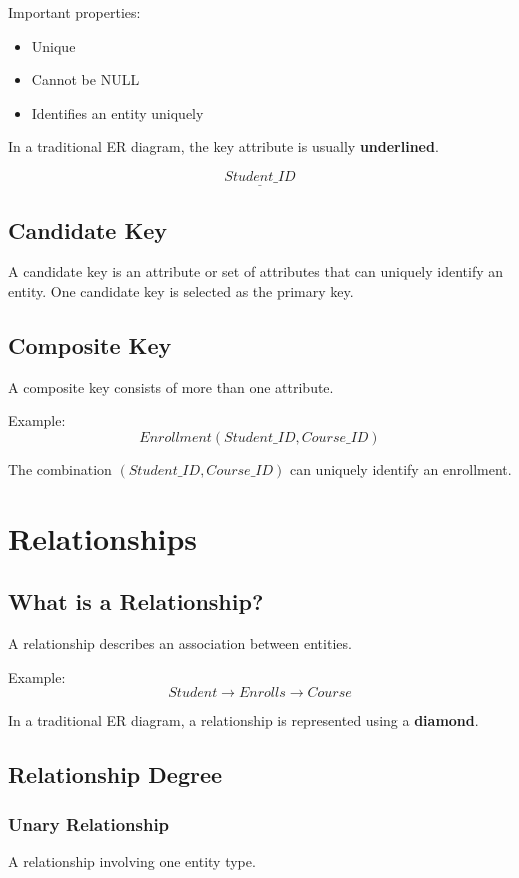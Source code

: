\documentclass[12pt,a4paper]{article}
\begin{document}
Important properties:
\begin{itemize}
\item Unique
\item Cannot be NULL
\item Identifies an entity uniquely
\end{itemize}

In a traditional ER diagram, the key attribute is usually \textbf{underlined}.

\[
\underline{Student\_ID}
\]

\subsection{Candidate Key}
A candidate key is an attribute or set of attributes that can uniquely identify an entity. One candidate key is selected as the primary key.

\subsection{Composite Key}
A composite key consists of more than one attribute.

Example:
\[
Enrollment(Student\_ID, Course\_ID)
\]

The combination $(Student\_ID, Course\_ID)$ can uniquely identify an enrollment.

\section{Relationships}

\subsection{What is a Relationship?}
A relationship describes an association between entities.

Example:
\[
Student \longrightarrow Enrolls \longrightarrow Course
\]

In a traditional ER diagram, a relationship is represented using a \textbf{diamond}.

\subsection{Relationship Degree}

\subsubsection{Unary Relationship}
A relationship involving one entity type.
\end{document}
